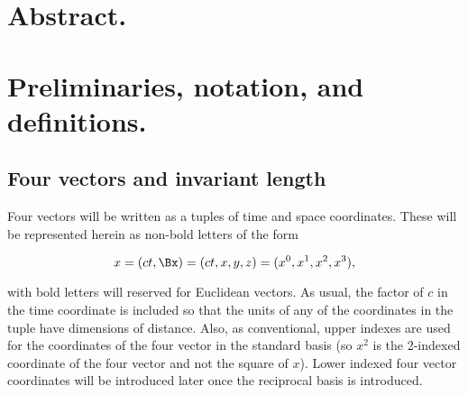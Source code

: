 %
%
%
%
%
%
%
%
%
%
%




\section{Abstract.}


\section{Preliminaries, notation, and definitions.}

\subsection{Four vectors and invariant length}

Four vectors will be written as a tuples of time and space coordinates.  These will be represented herein as non-bold letters of the form

\begin{equation}\label{eqn:grahamSchmidtLorentz:10}
x = (c t, \Bx) = ( c t, x, y, z ) = ( x^0, x^1, x^2, x^3 ),
\end{equation}

with bold letters will reserved for Euclidean vectors.  As usual, the factor of $c$ in the time coordinate is included so that the units of any of the coordinates in the tuple have dimensions of distance.  Also, as conventional, upper indexes are used for the coordinates of the four vector in the standard basis (so $x^2$ is the 2-indexed coordinate of the four vector and not the square of $x$).  Lower indexed four vector coordinates will be introduced later once the reciprocal basis is introduced.

